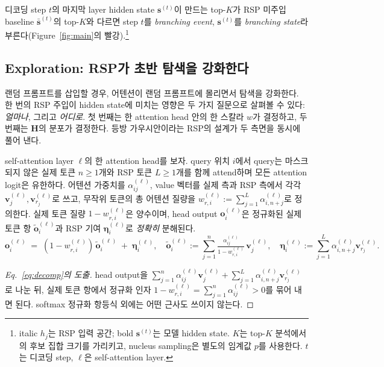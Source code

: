 디코딩 step $t$의 마지막 layer hidden state $\mathbf{s}^{(t)}$이 만드는 top-$K$가 RSP 미주입 baseline $\bar{\mathbf{s}}^{(t)}$의 top-$K$와 다르면 step $t$를 \emph{branching event}, $\mathbf{s}^{(t)}$를 \emph{branching state}라 부른다(Figure~\ref{fig:main}의 빨강).\footnote{italic $h_j$는 RSP 입력 공간; bold $\mathbf{s}^{(t)}$는 모델 hidden state. $K$는 top-$K$ 분석에서의 후보 집합 크기를 가리키고, nucleus sampling은 별도의 임계값 $p$를 사용한다. $t$는 디코딩 step, $\ell$은 self-attention layer.}

\subsection{Exploration: RSP가 초반 탐색을 강화한다}\label{sec:improve}\label{sec:multipath}

랜덤 프롬프트를 삽입할 경우, 어텐션이 랜덤 프롬프트에 몰리면서 탐색을 강화한다. 한 번의 RSP 주입이 hidden state에 미치는 영향은 두 가지 질문으로 살펴볼 수 있다: \emph{얼마나}, 그리고 \emph{어디로}. 첫 번째는 한 attention head 안의 한 스칼라 $w$가 결정하고, 두 번째는 $\mathbf{H}$의 분포가 결정한다. 등방 가우시안이라는 RSP의 설계가 두 측면을 동시에 풀어 낸다.

self-attention layer $\ell$의 한 attention head를 보자. query 위치 $i$에서 query는 마스크되지 않은 실제 토큰 $n\ge1$개와 RSP 토큰 $L\ge1$개를 함께 attend하며 모든 attention logit은 유한하다. 어텐션 가중치를 $\alpha_{ij}^{(\ell)}$, value 벡터를 실제 측과 RSP 측에서 각각 $\mathbf{v}_j^{(\ell)},\mathbf{v}_{r_j}^{(\ell)}$로 쓰고, 무작위 토큰의 총 어텐션 질량을 $w_{r,i}^{(\ell)} := \sum_{j=1}^L \alpha_{i,n+j}^{(\ell)}$로 정의한다. 실제 토큰 질량 $1-w_{r,i}^{(\ell)}$은 양수이며, head output $\mathbf{o}_i^{(\ell)}$은 정규화된 실제 토큰 항 $\tilde{\mathbf{o}}_i^{(\ell)}$과 RSP 기여 $\boldsymbol{\eta}_i^{(\ell)}$로 \emph{정확히} 분해된다.
\begin{equation}\label{eq:decomp}
\mathbf{o}_i^{(\ell)}
\;=\;
(1-w_{r,i}^{(\ell)})\,\tilde{\mathbf{o}}_i^{(\ell)}
\;+\;
\boldsymbol{\eta}_i^{(\ell)},
\quad
\tilde{\mathbf{o}}_i^{(\ell)} := \sum_{j=1}^n \tfrac{\alpha_{ij}^{(\ell)}}{1-w_{r,i}^{(\ell)}}\,\mathbf{v}_j^{(\ell)},
\quad
\boldsymbol{\eta}_i^{(\ell)} := \sum_{j=1}^L \alpha_{i,n+j}^{(\ell)}\mathbf{v}_{r_j}^{(\ell)}.
\end{equation}

\begin{proof}[Eq.~\eqref{eq:decomp}의 도출]
head output을 $\sum_{j=1}^{n}\alpha_{ij}^{(\ell)}\mathbf{v}_{j}^{(\ell)}+\sum_{j=1}^{L}\alpha_{i,n+j}^{(\ell)}\mathbf{v}_{r_j}^{(\ell)}$로 나눈 뒤, 실제 토큰 항에서 정규화 인자 $1-w_{r,i}^{(\ell)} = \sum_{j=1}^n \alpha_{ij}^{(\ell)}>0$를 묶어 내면 된다. softmax 정규화 항등식 외에는 어떤 근사도 쓰이지 않는다.
\end{proof}

